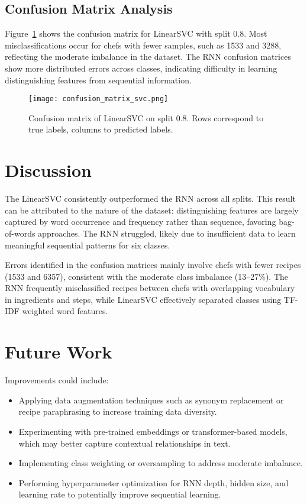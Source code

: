 \documentclass[twocolumn,10pt]{article}
\begin{document}
\subsection{Confusion Matrix Analysis}
Figure~\ref{fig:confusion_svc} shows the confusion matrix for LinearSVC with split 0.8. Most misclassifications occur for chefs with fewer samples, such as 1533 and 3288, reflecting the moderate imbalance in the dataset. The RNN confusion matrices show more distributed errors across classes, indicating difficulty in learning distinguishing features from sequential information.  

\begin{figure}[h!]
\centering
\texttt{[image: confusion\_matrix\_svc.png]}
\caption{Confusion matrix of LinearSVC on split 0.8. Rows correspond to true labels, columns to predicted labels.}
\label{fig:confusion_svc}
\end{figure}

\section{Discussion}

The LinearSVC consistently outperformed the RNN across all splits. This result can be attributed to the nature of the dataset: distinguishing features are largely captured by word occurrence and frequency rather than sequence, favoring bag-of-words approaches. The RNN struggled, likely due to insufficient data to learn meaningful sequential patterns for six classes.  

Errors identified in the confusion matrices mainly involve chefs with fewer recipes (1533 and 6357), consistent with the moderate class imbalance (13–27\%). The RNN frequently misclassified recipes between chefs with overlapping vocabulary in ingredients and steps, while LinearSVC effectively separated classes using TF-IDF weighted word features.  

\section{Future Work}

Improvements could include:  

\begin{itemize}
    \item Applying data augmentation techniques such as synonym replacement or recipe paraphrasing to increase training data diversity.  
    \item Experimenting with pre-trained embeddings or transformer-based models, which may better capture contextual relationships in text.  
    \item Implementing class weighting or oversampling to address moderate imbalance.  
    \item Performing hyperparameter optimization for RNN depth, hidden size, and learning rate to potentially improve sequential learning.  
\end{itemize}
\end{document}
